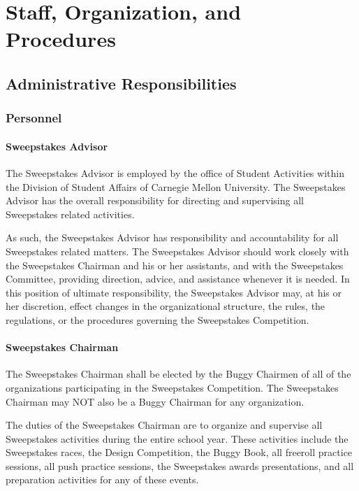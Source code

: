 \chapter{Staff, Organization, and Procedures}

\section{Administrative Responsibilities}

\subsection{Personnel}

\subsubsection{Sweepstakes Advisor}

	The Sweepstakes Advisor is employed by the office of Student Activities within
	the Division of Student Affairs of Carnegie Mellon University. The Sweepstakes
	Advisor has the overall responsibility for directing and supervising all
	Sweepstakes related activities.	

	As such, the Sweepstakes Advisor has responsibility and accountability for all Sweepstakes
	related matters. The Sweepstakes Advisor should work closely with the Sweepstakes Chairman
	and his or her assistants, and with the Sweepstakes Committee, providing
	direction, advice, and assistance whenever it is needed. In this position of
	ultimate responsibility, the Sweepstakes Advisor may, at his or her discretion,
	effect changes in the organizational structure, the rules, the regulations, or
	the procedures governing the Sweepstakes Competition.

\subsubsection{Sweepstakes Chairman}

	The Sweepstakes Chairman shall be elected by the Buggy Chairmen of all of the
	organizations participating in the Sweepstakes Competition. The Sweepstakes
	Chairman may NOT also be a Buggy Chairman for any organization.

	The duties of the Sweepstakes Chairman are to organize and supervise all
	Sweepstakes activities during the entire school year. These activities include
	the Sweepstakes races, the Design Competition, the Buggy Book, all freeroll
	practice sessions, all push practice sessions, the Sweepstakes awards
	presentations, and all preparation activities for any of these events.

